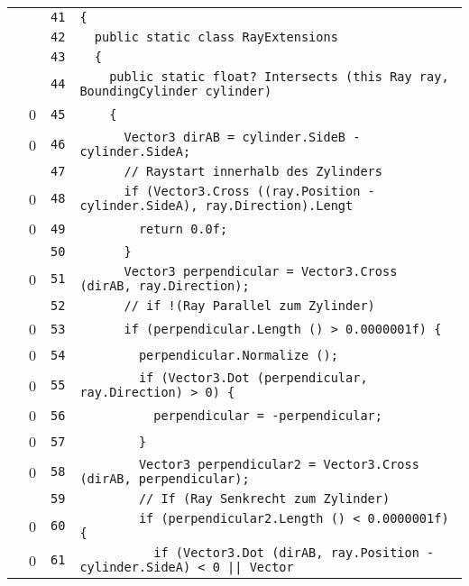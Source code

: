 \documentclass[a4paper,10pt]{article}
\begin{document}
\begin{longtable}[l]{lrrl}
\cellcolor{gray} &  & \verb~41~ & \verb~{~\\
\cellcolor{gray} &  & \verb~42~ & \verb~  public static class RayExtensions~\\
\cellcolor{gray} &  & \verb~43~ & \verb~  {~\\
\cellcolor{gray} &  & \verb~44~ & \verb~    public static float? Intersects (this Ray ray, BoundingCylinder cylinder)~\\
\cellcolor{red} & 0 & \verb~45~ & \verb~    {~\\
\cellcolor{red} & 0 & \verb~46~ & \verb~      Vector3 dirAB = cylinder.SideB - cylinder.SideA;~\\
\cellcolor{gray} &  & \verb~47~ & \verb~      // Raystart innerhalb des Zylinders~\\
\cellcolor{red} & 0 & \verb~48~ & \verb~      if (Vector3.Cross ((ray.Position - cylinder.SideA), ray.Direction).Lengt~\\
\cellcolor{red} & 0 & \verb~49~ & \verb~        return 0.0f;~\\
\cellcolor{gray} &  & \verb~50~ & \verb~      }~\\
\cellcolor{red} & 0 & \verb~51~ & \verb~      Vector3 perpendicular = Vector3.Cross (dirAB, ray.Direction);~\\
\cellcolor{gray} &  & \verb~52~ & \verb~      // if !(Ray Parallel zum Zylinder)~\\
\cellcolor{red} & 0 & \verb~53~ & \verb~      if (perpendicular.Length () > 0.0000001f) {~\\
\cellcolor{red} & 0 & \verb~54~ & \verb~        perpendicular.Normalize ();~\\
\cellcolor{red} & 0 & \verb~55~ & \verb~        if (Vector3.Dot (perpendicular, ray.Direction) > 0) {~\\
\cellcolor{red} & 0 & \verb~56~ & \verb~          perpendicular = -perpendicular;~\\
\cellcolor{red} & 0 & \verb~57~ & \verb~        }~\\
\cellcolor{red} & 0 & \verb~58~ & \verb~        Vector3 perpendicular2 = Vector3.Cross (dirAB, perpendicular);~\\
\cellcolor{gray} &  & \verb~59~ & \verb~        // If (Ray Senkrecht zum Zylinder)~\\
\cellcolor{red} & 0 & \verb~60~ & \verb~        if (perpendicular2.Length () < 0.0000001f) {~\\
\cellcolor{red} & 0 & \verb~61~ & \verb~          if (Vector3.Dot (dirAB, ray.Position - cylinder.SideA) < 0 || Vector~\\

\end{longtable}
\end{document}
